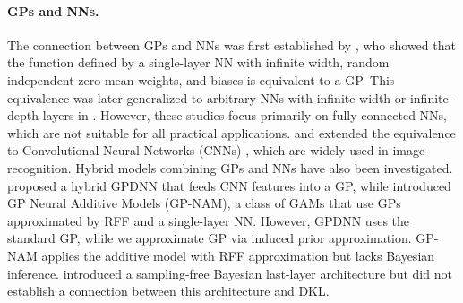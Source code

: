 \paragraph{GPs and NNs.}
The connection between GPs and NNs was first established by \citet{neal1994bayesian}, who showed that the function defined by a single-layer NN with infinite width, random independent zero-mean weights, and biases is equivalent to a GP. This equivalence was later generalized to arbitrary NNs with infinite-width or infinite-depth layers in \citep{lee2017deep, cutajar2017random, matthews2018gaussian, yang2019wide, dutordoir2021deep, gao2023wide}. However, these studies focus primarily on fully connected NNs, which are not suitable for all practical applications. \citet{garriga2018deep} and \citet{novak2018bayesian} extended the equivalence to Convolutional Neural Networks (CNNs) \citep{lecun1989handwritten}, which are widely used in image recognition. Hybrid models combining GPs and NNs have also been investigated. \citet{bradshaw2017adversarial} proposed a hybrid GPDNN that feeds CNN features into a GP, while \citet{zhang2024gaussian} introduced GP Neural Additive Models (GP-NAM), a class of GAMs that use GPs approximated by RFF and a single-layer NN. However, GPDNN uses the standard GP, while we approximate GP via induced prior approximation. GP-NAM applies the additive model with RFF approximation but lacks Bayesian inference. \citet{harrison2024variational} introduced a sampling-free Bayesian last-layer architecture but did not establish a connection between this architecture and DKL. %
